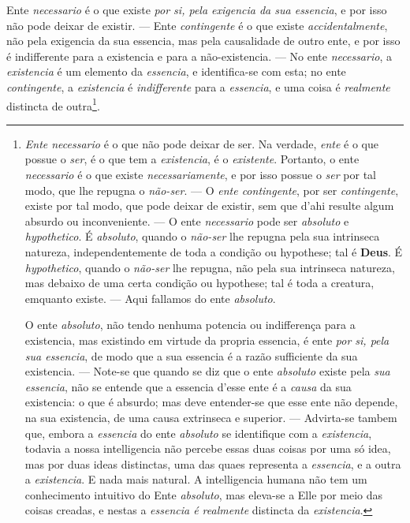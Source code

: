  Ente \emph{necessario} é o que existe
\emph{por si, pela exigencia da sua essencia}, e por isso não pode deixar de existir. ---
Ente \emph{contingente} é o que existe \emph{accidentalmente}, não pela exigencia da sua
essencia, mas pela causalidade de outro ente, e por isso é indifferente para a
 existencia e para a não-existencia. --- No ente \emph{necessario}, a
\emph{existencia} é um elemento da \emph{essencia}, e identifica-se com esta; no ente
\emph{contingente}, a \emph{existencia} é \emph{indifferente} para a \emph{essencia}, e
uma coisa é \emph{realmente} distincta de outra\footnote{\emph{Ente necessario} é o que
não pode deixar de ser. Na verdade, \emph{ente} é o que possue o \emph{ser}, é o que tem
a \emph{existencia}, é o \emph{existente}. Portanto, o ente \emph{necessario} é o que
existe \emph{necessariamente}, e por isso possue o \emph{ser} por tal modo, que lhe
repugna o \emph{não-ser}. --- O \emph{ente contingente}, por ser \emph{contingente},
existe por tal modo, que pode deixar de existir, sem que d'ahi resulte algum absurdo ou
inconveniente. --- O ente \emph{necessario} pode ser \emph{absoluto} e
\emph{hypothetico}. É \emph{absoluto}, quando o \emph{não-ser} lhe repugna pela sua
intrinseca natureza, independentemente de toda a condição ou hypothese; tal é
\textbf{Deus}. É \emph{hypothetico}, quando o \emph{não-ser} lhe repugna, não pela sua
intrinseca natureza, mas debaixo de uma certa condição ou hypothese; tal é toda a
creatura, emquanto existe. --- Aqui fallamos do ente \emph{absoluto}.

O ente \emph{absoluto}, não tendo nenhuma potencia ou indifferença para a existencia, mas
existindo em virtude da propria essencia, é ente \emph{por si, pela sua essencia}, de
modo que a sua essencia é a razão sufficiente da sua existencia. --- Note-se que quando
se diz que o ente \emph{absoluto} existe pela \emph{sua essencia}, não se entende que a
essencia d'esse ente é a \emph{causa} da sua existencia: o que é absurdo; mas deve
entender-se que esse ente não depende, na sua existencia, de uma causa extrinseca e
superior. --- Advirta-se tambem que, embora a \emph{essencia} do ente \emph{absoluto} se
identifique com a \emph{existencia}, todavia a nossa intelligencia não percebe essas duas
coisas por uma só idea, mas por duas ideas distinctas, uma das quaes representa a
\emph{essencia}, e a outra a \emph{existencia}. E nada mais natural. A intelligencia
humana não tem um conhecimento intuitivo do Ente \emph{absoluto}, mas eleva-se a Elle por
meio das coisas creadas, e nestas a \emph{essencia é realmente} distincta da
\emph{existencia}.}.

